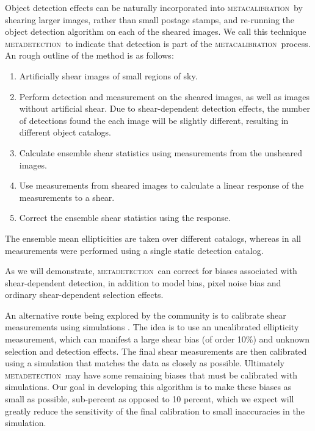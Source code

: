 \documentclass[iop, twocolappendix, appendixfloats, numberedappendix, apj]{hackemulateapj}
\newcommand{\mcal}{\textsc{metacalibration}}
\newcommand{\mdet}{\textsc{metadetection}}
\begin{document}
Object detection effects can be naturally incorporated into \mcal\ by shearing
larger images, rather than small postage stamps, and re-running the object
detection algorithm on each of the sheared images.
We call this technique \mdet\ to indicate that detection is part of the \mcal\
process.  An rough outline of the method is as follows: \begin{enumerate}

    \item Artificially shear images of small regions of sky.

    \item Perform detection and measurement on the sheared images, as well as
        images without artificial shear.  Due to shear-dependent detection
        effects, the number of detections found the each image will be slightly
        different, resulting in different object catalogs.

    \item Calculate ensemble shear statistics using measurements from the
        unsheared images.

    \item Use measurements from sheared images to calculate a linear response
        of the measurements to a shear.

    \item Correct the ensemble shear statistics using the response.

\end{enumerate}
The ensemble mean ellipticities are taken over different catalogs, whereas in
\cite{SheldonMcal2017} all measurements were performed using a single static
detection catalog.

As we will demonstrate, \mdet\ can correct for biases associated with
shear-dependent detection, in addition to model bias, pixel noise bias
and ordinary shear-dependent selection effects.

An alternative route being explored by the community is to calibrate shear
measurements using simulations \citep[see, e.g.,][]{KIDS450shear,HSCY1shear}.
The idea is to use an uncalibrated ellipticity measurement, which can manifest
a large shear bias (of order 10\%) and  unknown selection and detection
effects.  The final shear measurements are then calibrated using a simulation
that matches the data as closely as possible.  Ultimately \mdet\ may have some
remaining biases that must be calibrated with simulations.  Our goal in
developing this algorithm is to make these biases as small as possible,
sub-percent as opposed to 10 percent, which we expect will greatly reduce the
sensitivity of the final calibration to small inaccuracies in the simulation.
\end{document}
